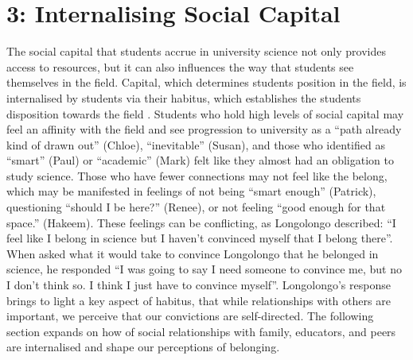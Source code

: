 \section{3: Internalising Social Capital}
The social capital that students accrue in university science not only provides access to resources, but it can also influences the way that students see themselves in the field. Capital, which determines students position in the field, is internalised by students via their habitus, which establishes the students disposition towards the field \cite{Bourdieu1992}. Students who hold high levels of social capital may feel an affinity with the field and see progression to university as a ``path already kind of drawn out'' (Chloe), ``inevitable'' (Susan), and those who identified as ``smart'' (Paul) or ``academic'' (Mark) felt like they almost had an obligation to study science. Those who have fewer connections may not feel like the belong, which may be manifested in feelings of not being ``smart enough'' (Patrick), questioning ``should I be here?'' (Renee), or not feeling ``good enough for that space.'' (Hakeem). These feelings can be conflicting, as Longolongo described: ``I feel like I belong in science but I haven’t convinced myself that I belong there''. When asked what it would take to convince Longolongo that he belonged in science, he responded ``I was going to say I need someone to convince me, but no I don’t think so. I think I just have to convince myself''. Longolongo's response brings to light a key aspect of habitus, that while relationships with others are important, we perceive that our convictions are self-directed. The following section expands on how of social relationships with family, educators, and peers are internalised and shape our perceptions of belonging.
 


